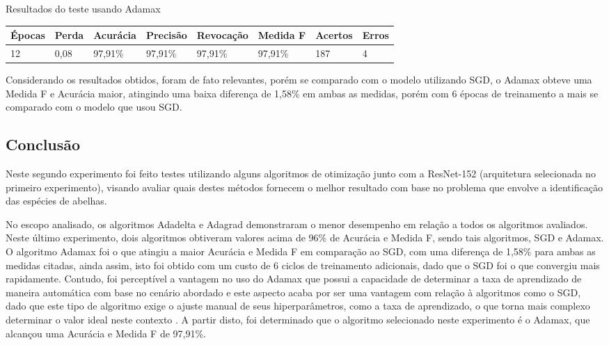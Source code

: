 \documentclass[
	12pt,				%
	oneside,			%
	a4paper,			%
	english,			%
	brazil				%
	]{abntex2ppgsi}
\begin{document}
\begin{quadro}[H]
\caption{Resultados do teste usando Adamax}
\label{quad:test_adamax}
\centering
\begin{tabular}{|l|l|l|l|l|l|l|l|}
\cline{1-8}
Épocas & Perda & Acurácia & Precisão & Revocação & Medida F & Acertos & Erros \\ \hline
12 & 0,08 & 97,91\% & 97,91\% & 97,91\% & 97,91\% & 187 & 4 \\
\cline{1-8}
\end{tabular}
\end{quadro}

Considerando os resultados obtidos, foram de fato relevantes, porém se comparado com o modelo utilizando SGD, o Adamax obteve uma Medida F e Acurácia maior, atingindo uma baixa diferença de 1,58\% em ambas as medidas, porém com 6 épocas de treinamento a mais se comparado com o modelo que usou SGD.

\subsection{Conclusão}
Neste segundo experimento foi feito testes utilizando alguns algoritmos de otimização junto com a ResNet-152 (arquitetura selecionada no primeiro experimento), visando avaliar quais destes métodos fornecem o melhor resultado com base no problema que envolve a identificação das espécies de abelhas.

No escopo analisado, os algoritmos Adadelta e Adagrad demonstraram o menor desempenho em relação a todos os algoritmos avaliados. Neste último experimento, dois algoritmos obtiveram valores acima de 96\% de Acurácia e Medida F, sendo tais algoritmos, SGD e Adamax. O algoritmo Adamax foi o que atingiu a maior Acurácia e Medida F em comparação ao SGD, com uma diferença de 1,58\% para ambas as medidas citadas, ainda assim, isto foi obtido com um custo de 6 ciclos de treinamento adicionais, dado que o SGD foi o que convergiu mais rapidamente. Contudo, foi perceptível a vantagem no uso do Adamax que possui a capacidade de determinar a taxa de aprendizado de maneira automática com base no cenário abordado e este aspecto acaba por ser uma vantagem com relação à algoritmos como o SGD, dado que este tipo de algoritmo exige o ajuste manual de seus hiperparâmetros, como a taxa de aprendizado, o que torna mais complexo determinar o valor ideal neste contexto \cite{le2011optimization}. A partir disto, foi determinado que o algoritmo selecionado neste experimento é o Adamax, que alcançou uma Acurácia e Medida F de 97,91\%.
\end{document}
